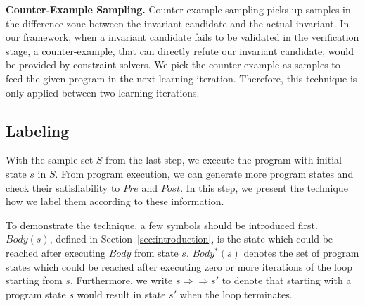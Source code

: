 \medskip\noindent
\textbf{Counter-Example Sampling.}
Counter-example sampling picks up samples in the difference zone between the invariant candidate and the actual invariant.
In our framework, when a invariant candidate fails to be validated in the verification stage,
a counter-example, that can directly refute our invariant candidate, would be provided by constraint solvers.
We pick the counter-example as samples to feed the given program in the next learning iteration.
Therefore, this technique is only applied between two learning iterations.



\subsection {Labeling}
With the sample set $S$ from the last step, we execute the program with initial state $s$ in $S$.
From program execution, we can generate more program states and check their satisfiability to $Pre$ and $Post$.
In this step, we present the technique how we label them according to these information.

To demonstrate the technique, a few symbols should be introduced first.
$Body(s)$, defined in Section~\ref{sec:introduction}, is the state which could be reached after executing $Body$ from state $s$.
$Body^*(s)$ denotes the set of program states which could be reached after executing zero or more iterations of the loop starting from $s$.
Furthermore, we write $s \Rightarrow\Rightarrow s'$ to denote that starting with a program state $s$ would result in state $s'$ when the loop terminates. 

